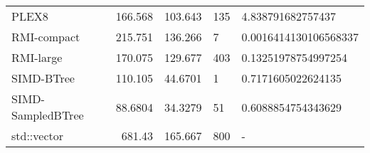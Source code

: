 \begin{tabular}{lrrll}
 PLEX8             &               166.568  &              103.643  & 135          & 4.838791682757437     \\
 RMI-compact       &               215.751  &              136.266  & 7            & 0.0016414130106568337 \\
 RMI-large         &               170.075  &              129.677  & 403          & 0.13251978754997254   \\
 SIMD-BTree        &               110.105  &               44.6701 & 1            & 0.7171605022624135    \\
 SIMD-SampledBTree &                88.6804 &               34.3279 & 51           & 0.6088854754343629    \\
 std::vector       &               681.43   &              165.667  & 800          & -                     \\
\hline
\end{tabular}